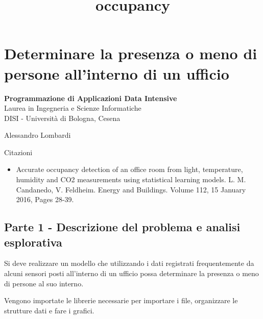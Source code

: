 \documentclass[11pt]{article}
\title{occupancy}
\providecommand{\tightlist}{%
      \setlength{\itemsep}{0pt}\setlength{\parskip}{0pt}}
\begin{document}
    
    
    \maketitle
    
    

    
    \hypertarget{determinare-la-presenza-o-meno-di-persone-allinterno-di-un-ufficio}{%
\section{Determinare la presenza o meno di persone all'interno di un
ufficio}\label{determinare-la-presenza-o-meno-di-persone-allinterno-di-un-ufficio}}

\textbf{Programmazione di Applicazioni Data Intensive}\\
Laurea in Ingegneria e Scienze Informatiche\\
DISI - Università di Bologna, Cesena

Alessandro Lombardi

    Citazioni

\begin{itemize}
\tightlist
\item
  Accurate occupancy detection of an office room from light,
  temperature, humidity and CO2 measurements using statistical learning
  models. L. M. Candanedo, V. Feldheim. Energy and Buildings. Volume
  112, 15 January 2016, Pages 28-39.
\end{itemize}

    \hypertarget{parte-1---descrizione-del-problema-e-analisi-esplorativa}{%
\subsection{Parte 1 - Descrizione del problema e analisi
esplorativa}\label{parte-1---descrizione-del-problema-e-analisi-esplorativa}}

Si deve realizzare un modello che utilizzando i dati registrati
frequentemente da alcuni sensori posti all'interno di un ufficio possa
determinare la presenza o meno di persone al suo interno.

Vengono importate le librerie necessarie per importare i file,
organizzare le strutture dati e fare i grafici.
\end{document}
